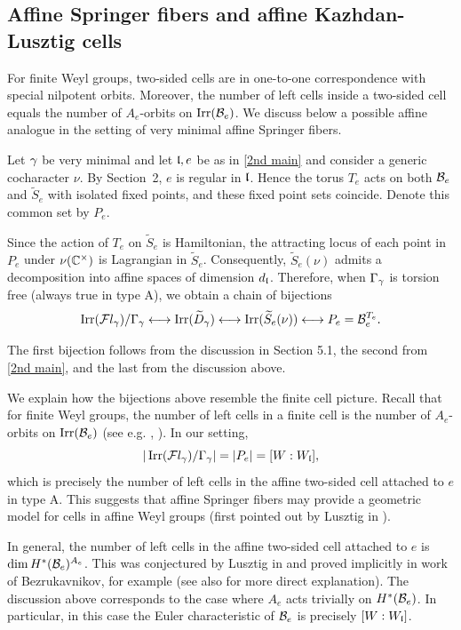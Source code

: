 \documentclass[11pt]{article}
\numberwithin{equation}{section}
\begin{document}
\subsection{Affine Springer fibers and affine Kazhdan-Lusztig cells}

For finite Weyl groups, two-sided cells are in one-to-one correspondence with special nilpotent orbits. Moreover, the number of left cells inside a two-sided cell equals the number of $A_e$-orbits on $\operatorname{Irr}(\mathcal{B}_e)$. We discuss below a possible affine analogue in the setting of very minimal affine Springer fibers.

Let $\gamma$ be very minimal and let $\mathfrak{l},e$ be as in \cref{2nd main} and consider a generic cocharacter $\nu$. By Section~2, $e$ is regular in $\mathfrak{l}$. Hence the torus $T_e$ acts on both $\mathcal{B}_e$ and $\widetilde{S}_e$ with isolated fixed points, and these fixed point sets coincide. Denote this common set by $P_e$.

Since the action of $T_e$ on $\widetilde{S}_e$ is Hamiltonian, the attracting locus of each point in $P_e$ under $\nu(\mathbb{C}^\times)$ is Lagrangian in $\widetilde{S}_e$. Consequently, $\widetilde{S}_e(\nu)$ admits a decomposition into affine spaces of dimension $d_{\mathfrak{l}}$. Therefore, when $\Gamma_\gamma$ is torsion free (always true in type A), we obtain a chain of bijections
\[
\operatorname{Irr}(\mathcal{F}l_\gamma)/\Gamma_\gamma
\longleftrightarrow
\operatorname{Irr}(\widetilde D_\gamma)
\longleftrightarrow
\operatorname{Irr}(\widetilde S_e(\nu))
\longleftrightarrow
P_e
=
\mathcal{B}_e^{T_e}.
\]

The first bijection follows from the discussion in Section 5.1, the second from \cref{2nd main}, and the last from the discussion above.

We explain how the bijections above resemble the finite cell picture. Recall that for finite Weyl groups, the number of left cells in a finite cell is the number of $A_e$-orbits on $\operatorname{Irr}(\mathcal{B}_e)$ (see e.g. \cite{Lus84}, \cite{LO14}). In our setting,
\[
|\operatorname{Irr}(\mathcal{F}l_\gamma)/\Gamma_\gamma|
= |P_e|=
[W:W_{\mathfrak{l}}],
\]
which is precisely the number of left cells in the affine two-sided cell attached to $e$ in type A. This suggests that affine Springer fibers may provide a geometric model for cells in affine Weyl groups (first pointed out by Lusztig in \cite[80]{Lusztigcomment}).

In general, the number of left cells in the affine two-sided cell attached to $e$ is
$\dim H^*(\mathcal{B}_e)^{A_e}$. This was conjectured by Lusztig in \cite[3.6]{Lus83} and proved implicitly in work of Bezrukavnikov, for example \cite[Proposition 8.25]{BL23} (see also \cite[Corollary 3.13]{Hoang2024Discretization} for more direct explanation). The discussion above corresponds to the case where $A_e$ acts trivially on $H^*(\mathcal{B}_e)$. In particular, in this case the Euler characteristic of $\mathcal{B}_e$ is precisely $[W:W_{\mathfrak{l}}]$.
\end{document}
